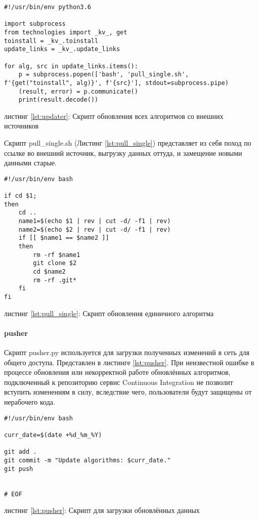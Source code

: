 \begin{center}
\begin{lstlisting}
#!/usr/bin/env python3.6

import subprocess
from technologies import _kv_, get
toinstall = _kv_.toinstall
update_links = _kv_.update_links

for alg, src in update_links.items():
    p = subprocess.popen(['bash', 'pull_single.sh', f'{get("toinstall", alg)}', f'{src}'], stdout=subprocess.pipe)
    (result, error) = p.communicate()
    print(result.decode())
\end{lstlisting}\label{lst:updater}
    листинг \ref{lst:updater}: Скрипт обновления всех алгоритмов со внешних источников
\end{center}

Скрипт {\small pull\_single.sh} (Листинг \ref{lst:pull_single}) представляет из
себя поход по ссылке во внешний источник, выгрузку данных оттуда, и замещение
новыми данными старые.

\begin{center}
\begin{lstlisting}
#!/usr/bin/env bash

if cd $1;
then
    cd ..
    name1=$(echo $1 | rev | cut -d/ -f1 | rev)
    name2=$(echo $2 | rev | cut -d/ -f1 | rev)
    if [[ $name1 == $name2 ]]
    then
        rm -rf $name1
        git clone $2
        cd $name2
        rm -rf .git*
    fi
fi
\end{lstlisting}\label{lst:pull_single}
    листинг \ref{lst:pull_single}: Скрипт обновления единичного алгоритма
\end{center}


\paragraph{pusher}

Скрипт {\small pusher.py} используется для загрузки полученных изменений в сеть
для общего доступа. Представлен в листинге \ref{lst:pusher}. При неизвестной
ошибке в процессе обновления или некорректной работе обновлённых алгоритмов,
подключенный к репозиторию сервис Continuous Integration не позволит вступить
изменениям в силу, вследствие чего, пользователи будут защищены от нерабочего
кода.

\begin{center}
\begin{lstlisting}
#!/usr/bin/env bash

curr_date=$(date +%d_%m_%Y)

git add .
git commit -m "Update algorithms: $curr_date."
git push


# EOF
\end{lstlisting}\label{lst:pusher}
    листинг \ref{lst:pusher}: Скрипт для загрузки обновлённых данных
\end{center}
